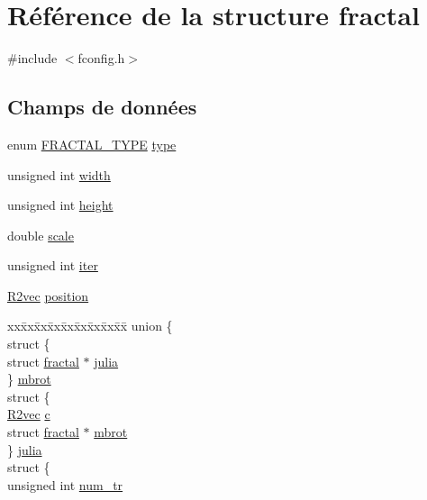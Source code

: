 \hypertarget{structfractal}{\section{\-Référence de la structure fractal}
\label{structfractal}
}


{\ttfamily \#include $<$fconfig.\-h$>$}

\subsection*{\-Champs de données}
\begin{DoxyCompactItemize}
\item 
enum \hyperlink{fconfig_8h_a26fc00c42acd082d3815249ab72e848b}{\-F\-R\-A\-C\-T\-A\-L\-\_\-\-T\-Y\-P\-E} \hyperlink{structfractal_af8297a3673f15a8aa61272bdc0377277}{type}
\item 
unsigned int \hyperlink{structfractal_a2cbfae43b5e12a3c427c241a46145a31}{width}
\item 
unsigned int \hyperlink{structfractal_a626e83cacaf19a85207e16fef9b3ff3d}{height}
\item 
double \hyperlink{structfractal_a524c6cac28c27976fe7b528733ee73cb}{scale}
\item 
unsigned int \hyperlink{structfractal_a71301ffefb1b8cb6c949575fb36788dd}{iter}
\item 
\hyperlink{structR2vec}{\-R2vec} \hyperlink{structfractal_a272b847ecd0537826d7ecb8e9ca3e4d5}{position}
\item 
\begin{tabbing}
xx\=xx\=xx\=xx\=xx\=xx\=xx\=xx\=xx\=\kill
union \{\\
\>struct \{\\
\>\>struct \hyperlink{structfractal}{fractal} $\ast$ \hyperlink{structfractal_a189b545deaac65ca9c6ea04f7312a3f1}{julia}\\
\>\} \hyperlink{structfractal_a6fcb083ec5b53d1f1ef8faf808370bb8}{mbrot}\\
\>struct \{\\
\>\>\hyperlink{structR2vec}{R2vec} \hyperlink{structfractal_ae5d135f6f99883eba1e2fea9047791f6}{c}\\
\>\>struct \hyperlink{structfractal}{fractal} $\ast$ \hyperlink{structfractal_a7c67058fed930d6a3f3500e170cb5fd0}{mbrot}\\
\>\} \hyperlink{structfractal_acfb4375b60967279197211d47eed0b0b}{julia}\\
\>struct \{\\
\>\>unsigned int \hyperlink{structfractal_aba2914c84dcc1a96c49e4b91aade9d7f}{num\_tr}\\

\end{tabbing}
\end{DoxyCompactItemize}
